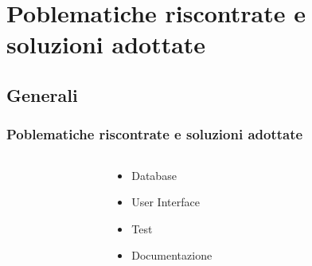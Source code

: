 \section{Poblematiche riscontrate e soluzioni adottate}
\subsection{Generali}

\begin{frame}
	\frametitle{Poblematiche riscontrate e soluzioni adottate}
	
		
		\begin{columns}
			\begin{column}{0.2\textwidth}
				
			\end{column}
			
			\begin{column}{0.4\textwidth}
				\begin{itemize}
					\item Database
					\item User Interface
					\item Test
					\item Documentazione
				
				\end{itemize}
			\end{column}
			
			\begin{column}{0.2\textwidth}
				
			\end{column}
		\end{columns}
		
		
\end{frame}




